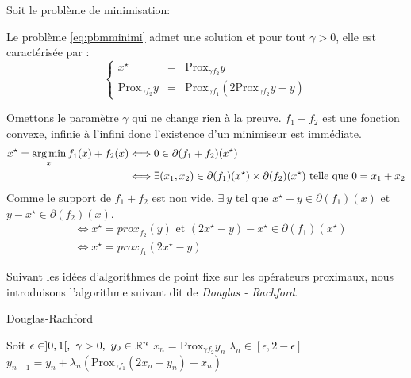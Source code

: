 \documentclass[a4paper,12pt]{article}
\newcommand{\prox}{\text{Prox}}
\begin{document}
 
Soit le problème de minimisation: \\


\begin{propriete}
Le problème \ref{eq:pbmminimi} admet une solution et pour tout $\gamma >0$, elle est caractérisée par :
$$
\left\{
\begin{array}{rcl}
x^{\star} &= & \prox_{\gamma f_2} y \\
\prox_{\gamma f_2}y &= & \prox_{\gamma f_1}(2\prox_{\gamma f_2}y -y)
\end{array}
\right.
$$
\end{propriete}

\begin{preuve}
Omettons le paramètre $\gamma$ qui ne change rien à la preuve. $f_1+f_2$ est une fonction convexe, infinie à l'infini donc l'existence d'un minimiseur est immédiate.
\begin{align*}
x^{\star} =\operatorname*{arg\,min}_x f_1(x) + f_2(x) &\Longleftrightarrow 0\in \partial (f_1+f_2)(x^{\star}) \\
&\Longleftrightarrow \exists (x_1,x_2)\in \partial(f_1)(x^{\star})\times\partial(f_2)(x^{\star}) \text{ telle que } 0=x_1+x_2
\end{align*}
Comme le support de $f_1+f_2$ est non vide, $\exists\ y$ tel que $x^{\star}-y\in \partial(f_1)(x)$ et $y-x^{\star}\in\partial(f_2)(x)$.
\begin{align*}
&\Longleftrightarrow x^{\star}=prox_{f_2} (y) \text{ et } (2x^{\star}-y)-x^{\star}\in\partial(f_1)(x^{\star})\\
&\Longleftrightarrow x^{\star} = prox_{f_1}(2x^{\star}-y)
\end{align*}
\end{preuve}

Suivant les idées d'algorithmes de point fixe sur les opérateurs proximaux, nous introduisons l'algorithme suivant dit de \emph{Douglas - Rachford}.
\begin{algorithm}
\caption{Douglas-Rachford}
\begin{algorithmic}
\STATE Soit $\epsilon \in ]0,1[,\ \gamma >0,\ y_0\in \RR^n$
\STATE $x_n = \prox_{\gamma f_2} y_n$
\STATE $\lambda_n \in [\epsilon,2-\epsilon]$
\STATE $y_{n+1} = y_n + \lambda_n(\prox_{\gamma f_1} (2x_n-y_n)-x_n)$
\ENDFOR
\end{algorithmic}
\end{algorithm}
\end{document}
